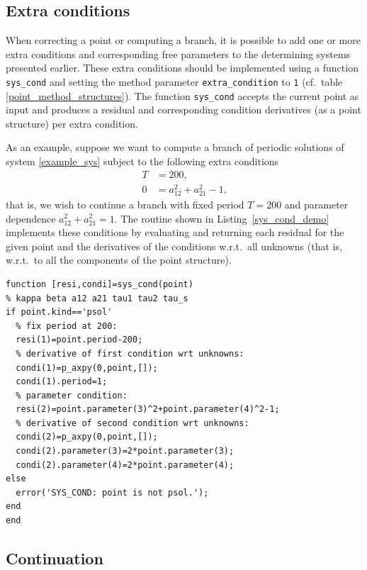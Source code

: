 \documentclass[10pt]{scrartcl}
\newcommand{\blist}[1]{\mbox{\lstinline!#1!}}
\begin{document}
{\subsection{Extra conditions}\label{extra_cond}

When correcting a point or computing a branch, it is possible to add
one or more extra conditions and corresponding free parameters to the
determining systems presented earlier. These extra conditions should
be implemented using a function \blist{sys_cond} and setting the
method parameter \blist{extra_condition} to \blist{1} (cf.\ table
\ref{point_method_structures}).  The function \blist{sys_cond} accepts
the current point as input and produces a residual and corresponding
condition derivatives (as a point structure) per extra condition.

As an example, suppose we want to compute a branch of
periodic solutions of system \eqref{example_sys} subject to the following
extra conditions 
\begin{equation}\label{eq:extra_cond}
  \begin{split}
    T&=200, \\
    0&=a_{12}^2+a_{21}^2-1\mbox{,}
  \end{split}
\end{equation}
that is, we wish to continue a branch with fixed period $T=200$ and
parameter dependence $a_{12}^2+a_{21}^2=1$.  The routine shown in
Listing~\ref{sys_cond_demo} implements these conditions by evaluating
and returning each residual for the given point and the derivatives of
the conditions w.r.t.\ all unknowns (that is, w.r.t.\ to all the
components of the point structure).
\begin{lstlisting}[frame=lines,label=sys_cond_demo,caption={Implementation
    extra conditions \eqref{eq:extra_cond} using a routine \blist{sys_cond}.}]
function [resi,condi]=sys_cond(point)
% kappa beta a12 a21 tau1 tau2 tau_s
if point.kind=='psol'
  % fix period at 200:
  resi(1)=point.period-200;
  % derivative of first condition wrt unknowns:
  condi(1)=p_axpy(0,point,[]);
  condi(1).period=1;
  % parameter condition:
  resi(2)=point.parameter(3)^2+point.parameter(4)^2-1;
  % derivative of second condition wrt unknowns:
  condi(2)=p_axpy(0,point,[]);
  condi(2).parameter(3)=2*point.parameter(3);
  condi(2).parameter(4)=2*point.parameter(4);
else
  error('SYS_COND: point is not psol.');
end
end
\end{lstlisting}

\subsection{Continuation}\label{continuation}

}
\end{document}
